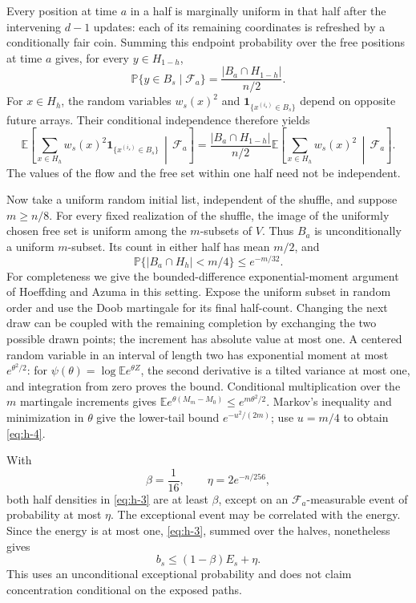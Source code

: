 \documentclass[11pt]{article}
\theoremstyle{remark}
\numberwithin{equation}{section}
\begin{document}
Every position at time \(a\) in a half is marginally uniform in that half after the intervening \(d-1\) updates: each of its remaining coordinates is refreshed by a conditionally fair coin. Summing this endpoint probability over the free positions at time \(a\) gives, for every \(y\in H_{1-h}\),
\[
 \mathbb P\{y\in B_s\mid\mathcal F_a\}
 =\frac{|B_a\cap H_{1-h}|}{n/2}.
\]
For \(x\in H_h\), the random variables \(w_s(x)^2\) and \(\mathbf1_{\{x^{(i_s)}\in B_s\}}\) depend on opposite future arrays. Their conditional independence therefore yields
\begin{equation}\label{eq:h-3}
 \mathbb E\left[\sum_{x\in H_h}w_s(x)^2
       \mathbf1_{\{x^{(i_s)}\in B_s\}}\,\middle|\,\mathcal F_a\right]
 =\frac{|B_a\cap H_{1-h}|}{n/2}
   \mathbb E\left[\sum_{x\in H_h}w_s(x)^2
                        \,\middle|\,\mathcal F_a\right].
\end{equation}
The values of the flow and the free set within one half need not be independent.

Now take a uniform random initial list, independent of the shuffle, and suppose \(m\ge n/8\). For every fixed realization of the shuffle, the image of the uniformly chosen free set is uniform among the \(m\)-subsets of \(V\). Thus \(B_a\) is unconditionally a uniform \(m\)-subset. Its count in either half has mean \(m/2\), and
\begin{equation}\label{eq:h-4}
 \mathbb P\{|B_a\cap H_h|<m/4\}\le e^{-m/32}.
\end{equation}
For completeness we give the bounded-difference exponential-moment argument of Hoeffding and Azuma \cite{hoeffding1963,azuma1967} in this setting. Expose the uniform subset in random order and use the Doob martingale for its final half-count. Changing the next draw can be coupled with the remaining completion by exchanging the two possible drawn points; the increment has absolute value at most one. A centered random variable in an interval of length two has exponential moment at most \(e^{\theta^2/2}\): for \(\psi(\theta)=\log\mathbb E e^{\theta Z}\), the second derivative is a tilted variance at most one, and integration from zero proves the bound. Conditional multiplication over the \(m\) martingale increments gives
\(\mathbb E e^{\theta(M_m-M_0)}\le e^{m\theta^2/2}\).
Markov's inequality and minimization in \(\theta\) give the lower-tail bound \(e^{-u^2/(2m)}\); use \(u=m/4\) to obtain \eqref{eq:h-4}.

With
\[
 \beta=\frac1{16},\qquad \eta=2e^{-n/256},
\]
both half densities in \eqref{eq:h-3} are at least \(\beta\), except on an \(\mathcal F_a\)-measurable event of probability at most \(\eta\). The exceptional event may be correlated with the energy. Since the energy is at most one, \eqref{eq:h-3}, summed over the halves, nonetheless gives
\begin{equation}\label{eq:h-5}
 b_s\le(1-\beta)E_s+\eta.
\end{equation}
This uses an unconditional exceptional probability and does not claim concentration conditional on the exposed paths.
\end{document}
